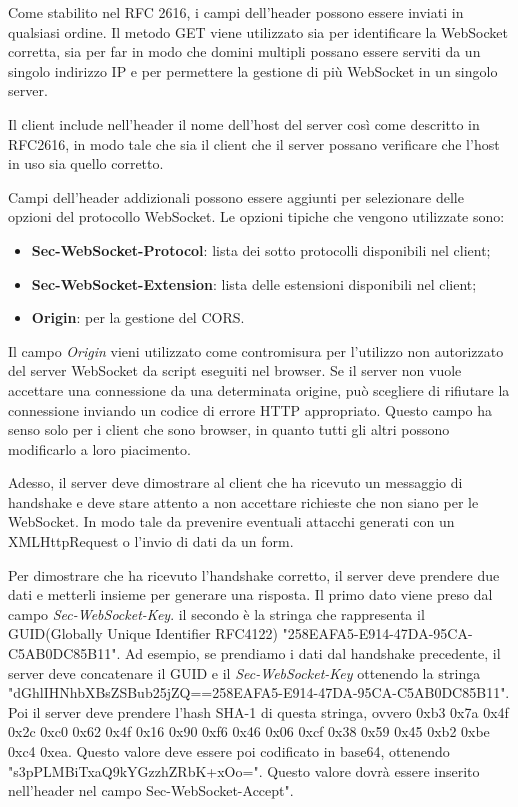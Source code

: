 Come stabilito nel RFC 2616\cite{RFC2616}, i campi dell'header possono essere inviati in qualsiasi ordine.  
Il metodo GET viene utilizzato sia per identificare la WebSocket corretta, sia per far in modo che domini multipli possano essere serviti da un singolo indirizzo IP e per permettere la gestione di più WebSocket in un singolo server.

Il client include nell'header il nome dell'host del server così come descritto in RFC2616, in modo tale che sia il client che il server
possano verificare che l'host in uso sia quello corretto.

Campi dell'header addizionali possono essere aggiunti  per selezionare
delle opzioni del protocollo WebSocket.
Le opzioni tipiche che vengono utilizzate sono:
\begin{itemize}
\item \textbf{Sec-WebSocket-Protocol}: lista dei sotto protocolli disponibili nel client;
\item \textbf{Sec-WebSocket-Extension}: lista delle estensioni disponibili nel client;
\item \textbf{Origin}: per la gestione del CORS.
\end{itemize}

Il campo \emph{Origin} vieni utilizzato come contromisura per 
l'utilizzo non autorizzato del server WebSocket da script eseguiti nel browser.
Se il server non vuole accettare una connessione da una determinata origine, 
può scegliere di rifiutare la connessione inviando un codice di errore HTTP appropriato.
Questo campo ha senso solo per i client che sono browser, in quanto tutti gli altri possono modificarlo a loro piacimento.

Adesso, il server deve dimostrare al client che ha ricevuto un messaggio di handshake e deve stare attento a non accettare richieste che non siano per le WebSocket.
In modo tale da prevenire eventuali attacchi generati con un XMLHttpRequest o l'invio di dati da un form.

Per dimostrare che ha ricevuto l'handshake corretto, il server deve prendere due dati e metterli insieme per generare una risposta.
Il primo dato viene preso dal campo \emph{Sec-WebSocket-Key}.
il secondo è la stringa che rappresenta il GUID(Globally Unique Identifier RFC4122\cite{RFC4122}) "258EAFA5-E914-47DA-95CA-C5AB0DC85B11".
Ad esempio, se prendiamo i dati dal handshake precedente, 
il server deve concatenare il GUID e il \emph{Sec-WebSocket-Key} ottenendo la stringa "dGhlIHNhbXBsZSBub25jZQ==258EAFA5-E914-47DA-95CA-C5AB0DC85B11".
Poi il server deve prendere l'hash SHA-1 di questa stringa, ovvero 
0xb3 0x7a 0x4f 0x2c 0xc0 0x62 0x4f 0x16 0x90 0xf6 0x46 0x06 0xcf 0x38 0x59 0x45 0xb2 0xbe 0xc4 0xea.
Questo valore deve essere poi codificato in base64, 
ottenendo "s3pPLMBiTxaQ9kYGzzhZRbK+xOo=".
Questo valore dovrà essere inserito nell'header nel campo Sec-WebSocket-Accept".

